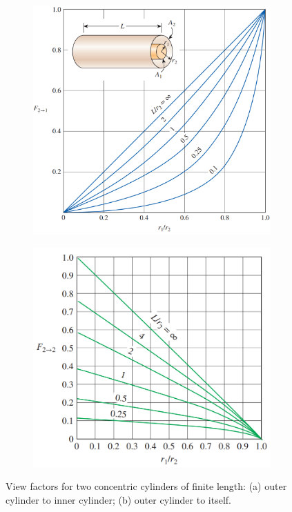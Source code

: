 \begin{figure}[H]
    \centering
    \begin{subfigure}[b]{0.4\textwidth}
        \includegraphics[width=\textwidth]{Figures/Sec13 concentric 2-1.png}
    \end{subfigure}
    \begin{subfigure}[b]{0.4\textwidth}
        \includegraphics[width=\textwidth]{Figures/Sec13 concentric 2-2.png}
    \end{subfigure}
    \caption{View factors for two concentric cylinders of finite length: (a) outer cylinder to inner cylinder; (b) outer cylinder to itself.}
    \label{fig:sec13_concentric_cylinders}
\end{figure}

